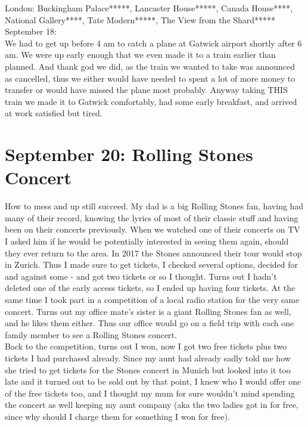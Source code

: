 London: Buckingham Palace*****, Lancaster House*****, Canada House****, National Gallery****, Tate Modern*****, The View from the Shard*****\\

September 18:\\
We had to get up before 4 am to catch a plane at Gatwick airport shortly after 6 am. We were up early enough that we even made it to a train earlier than planned. And thank god we did, as the train we wanted to take was announced as cancelled, thus we either would have needed to spent a lot of more money to transfer or would have missed the plane most probably. Anyway taking THIS train we made it to Gatwick comfortably, had some early breakfast, and arrived at work satisfied but tired.

\section{September 20: Rolling Stones Concert}
\label{2017RollingStones}

How to mess and up still succeed. My dad is a big Rolling Stones fan, having had many of their record, knowing the lyrics of most of their classic stuff and having been on their concerts previously. When we watched one of their concerts on TV I asked him if he would be potentially interested in seeing them again, should they ever return to the area. In 2017 the Stones announced their tour would stop in Zurich. Thus I made sure to get tickets, I checked several options, decided for and against some - and got two tickets or so I thought. Turns out I hadn't deleted one of the early access tickets, so I ended up having four tickets. At the same time I took part in a competition of a local radio station for the very same concert. Turns out my office mate's sister is a giant Rolling Stones fan as well, and he likes them either. Thus our office would go on a field trip with each one family member to see a Rolling Stones concert. \\
Back to the competition, turns out I won, now I got two free tickets plus two tickets I had purchased already. Since my aunt had already sadly told me how she tried to get tickets for the Stones concert in Munich but looked into it too late and it turned out to be sold out by that point, I knew who I would offer one of the free tickets too, and I thought my mum for sure wouldn't mind spending the concert as well keeping my aunt company (aka the two ladies got in for free, since why should I charge them for something I won for free).\\

